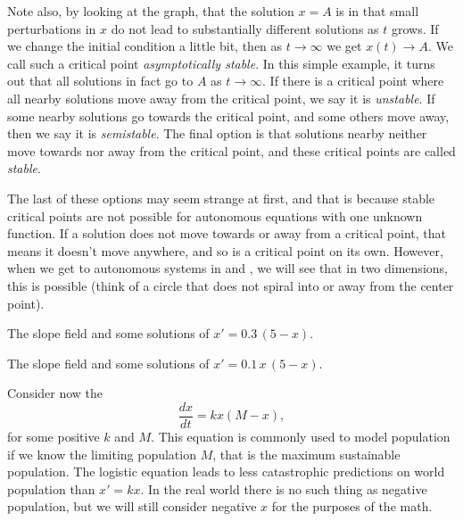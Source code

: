 Note also, by looking at the graph, that the solution $x=A$ is
 in
that small perturbations in $x$ do not lead to substantially different
solutions as $t$ grows.
If we change the initial condition a little bit, then as 
$t \to \infty$ we get $x(t) \to A$.  We call such a critical point
\emph{asymptotically stable}.
In this simple example, it turns out that all solutions in fact go to $A$
as $t \to \infty$.  If there is a critical point where all nearby solutions move away from the critical point, we say it is
\emph{unstable}. If some nearby solutions go towards the critical point, and some others move away, then we say it is \emph{semistable}. The final option is that solutions nearby neither move towards nor away from the critical point, and these critical points are called \emph{stable}.

The last of these options may seem strange at first, and that is because stable critical points are not possible for autonomous equations with one unknown function. If a solution does not move towards or away from a critical point, that means it doesn't move anywhere, and so is a critical point on its own. However, when we get to autonomous systems in  and , we will see that in two dimensions, this is possible (think of a circle that does not spiral into or away from the center point). 

\begin{myfig}
\parbox[t]{3.0in}{
 \capstart
 \caption{The slope field and some solutions of
 $x' = 0.3\,(5-x)$.\label{2.2:coffeefig}}
}
\quad
\parbox[t]{3.0in}{
 \capstart
 \caption{The slope field and some solutions of
 $x' = 0.1\,x\,(5-x)$.\label{2.2:logisticfig}}
}
\end{myfig}

\medskip

Consider now the \emph{}
\begin{equation*}
\frac{dx}{dt} = kx(M-x) ,
\end{equation*}
for some positive $k$ and $M$.  This equation is commonly used to model
population if we know the limiting population $M$, that is the maximum
sustainable population.  The logistic equation leads to 
less catastrophic
predictions on world population than $x'=kx$.  In the real world there is no
such thing as negative population, but we will still consider negative $x$ for
the purposes of the math.

